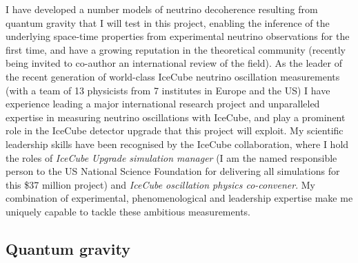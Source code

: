 \documentclass[a4paper,11pt]{article}
\begin{document}
I have developed a number models of neutrino decoherence resulting from quantum gravity that I will test in this project, enabling the inference of the underlying space-time properties from experimental neutrino observations for the first time, and have a growing reputation in the theoretical community (recently being invited to co-author an international review of the field). As the leader of the recent generation of world-class IceCube neutrino oscillation measurements (with a team of 13 physicists from 7 institutes in Europe and the US) I have experience leading a major international research project and unparalleled expertise in measuring neutrino oscillations with IceCube, and play a prominent role in the IceCube detector upgrade that this project will exploit. My scientific leadership skills have been recognised by the IceCube collaboration, where I hold the roles of \textit{IceCube Upgrade simulation manager} (I am the named responsible person to the US National Science Foundation for delivering all simulations for this \$37 million project) and \textit{IceCube oscillation physics co-convener}. My combination of experimental, phenomenological and leadership expertise make me uniquely capable to tackle these ambitious measurements. \\


\subsection{Quantum gravity}


\end{document}

